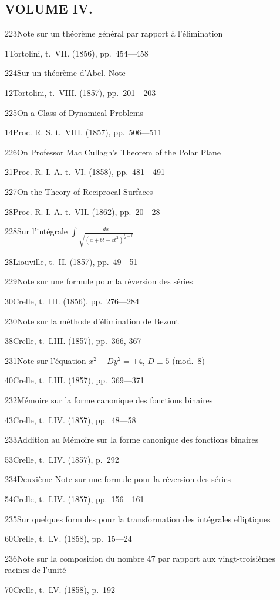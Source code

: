 \documentclass[11pt,a4paper]{book}
\providecommand{\tocentry}[2]{#1\dotfill #2\par}
\begin{document}
\newpage

\subsection*{VOLUME IV.}

\tocentry{223}{Note sur un th\'{e}or\`{e}me g\'{e}n\'{e}ral par rapport \`{a} l'\'{e}limination}{1}{Tortolini, t.~VII. (1856), pp.~454---458}

\tocentry{224}{Sur un th\'{e}or\`{e}me d'Abel. Note}{12}{Tortolini, t.~VIII. (1857), pp.~201---203}

\tocentry{225}{On a Class of Dynamical Problems}{14}{Proc. R. S. t.~VIII. (1857), pp.~506---511}

\tocentry{226}{On Professor Mac Cullagh's Theorem of the Polar Plane}{21}{Proc. R. I. A. t.~VI. (1858), pp.~481---491}

\tocentry{227}{On the Theory of Reciprocal Surfaces}{28}{Proc. R. I. A. t.~VII. (1862), pp.~20---28}

\tocentry{228}{Sur l'int\'{e}grale $\displaystyle\int \frac{dx}{\sqrt{(a + bt - ct^2)^{\frac{1}{2} + l}}}$}{28}{Liouville, t.~II. (1857), pp.~49---51}

\tocentry{229}{Note sur une formule pour la r\'{e}version des s\'{e}ries}{30}{Crelle, t.~III. (1856), pp.~276---284}

\tocentry{230}{Note sur la m\'{e}thode d'\'{e}limination de Bezout}{38}{Crelle, t.~LIII. (1857), pp.~366, 367}

\tocentry{231}{Note sur l'\'{e}quation $x^2 - Dy^2 = \pm 4$, $D \equiv 5$ (mod.~8)}{40}{Crelle, t.~LIII. (1857), pp.~369---371}

\tocentry{232}{M\'{e}moire sur la forme canonique des fonctions binaires}{43}{Crelle, t.~LIV. (1857), pp.~48---58}

\tocentry{233}{Addition au M\'{e}moire sur la forme canonique des fonctions binaires}{53}{Crelle, t.~LIV. (1857), p.~292}

\tocentry{234}{Deuxi\`{e}me Note sur une formule pour la r\'{e}version des s\'{e}ries}{54}{Crelle, t.~LIV. (1857), pp.~156---161}

\tocentry{235}{Sur quelques formules pour la transformation des int\'{e}grales elliptiques}{60}{Crelle, t.~LV. (1858), pp.~15---24}

\newpage

\tocentry{236}{Note sur la composition du nombre 47 par rapport aux vingt-troisi\`{e}mes racines de l'unit\'{e}}{70}{Crelle, t.~LV. (1858), p.~192}
\end{document}
